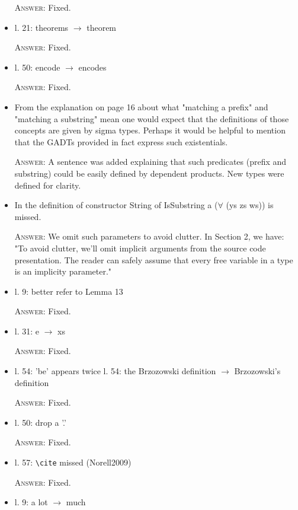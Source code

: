 \documentclass{article}
\begin{document}
\begin{itemize}
    \textsc{Answer}: Fixed.

    \item l. 21: theorems $\to$ theorem

    \textsc{Answer}: Fixed.

    \item l. 50: encode $\to$ encodes

    \textsc{Answer}: Fixed.

    \item From the explanation on page 16 about what "matching a prefix" and "matching a substring" mean one would expect that 
    the definitions of those concepts are given by sigma types. Perhaps it would be helpful to mention that the GADTs 
    provided in fact express such existentials.

    \textsc{Answer}: A sentence was added explaining that such predicates (prefix and substring) could be easily defined by dependent products.
    New types were defined for clarity.

    \item In the definition of constructor String of IsSubstring a ($\forall$ (ys zs ws)) is missed.

    \textsc{Answer}: We omit such parameters to avoid clutter. In Section 2, we have:
    "To avoid clutter, we'll omit implicit arguments from the source code presentation. The reader can safely assume that every free variable in a type is an implicity parameter."

    \item l. 9: better refer to Lemma 13

    \textsc{Answer}: Fixed.

    \item l. 31: e $\to$ xs

    \textsc{Answer}: Fixed.


    \item l. 54: 'be' appears twice
          l. 54: the Brzozowski definition $\to$ Brzozowski's definition

    \textsc{Answer}: Fixed.

    \item l. 50: drop a '.'

    \textsc{Answer}: Fixed.

    \item l. 57: \verb|\cite| missed (Norell2009)

    \textsc{Answer}: Fixed.

    \item l. 9: a lot $\to$ much


\end{itemize}
\end{document}
